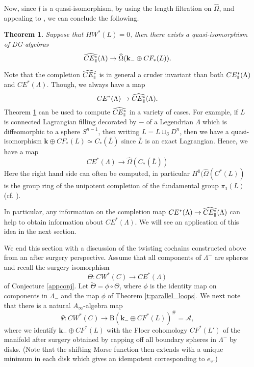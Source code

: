 \documentclass{gtpart}
\newtheorem{thm}{Theorem}
\renewcommand{\k}{\mathbf{k}}
\newcommand{\A}{\mathscr{A}}
\renewcommand{\Bar}{\mathrm{B}}
\renewcommand{\parallel}{{\mkern3mu\vphantom{\perp}\vrule depth 0pt\mkern2mu\vrule depth
0pt\mkern3mu}}
\begin{document}
Now, since $\mathfrak{f}$ is a quasi-isomorphism, by using the length filtration on
$\widehat{\Omega}$, and appealing to \cite[Thm. 7.4]{EM}, we can conclude the following. 

\begin{thm} \label{comple} 
	Suppose that $HW^*(L)=0$, then there exists a quasi-isomorphism of DG-algebras
    \[ \widehat{CE^*_{\parallel}}(\Lambda) \to \widehat{\Omega}(\k_{-} \oplus CF_*(L)). \]
\end{thm}

Note that the completion $\widehat{CE_{\parallel}^{*}}$ is in general a cruder invariant than
both $CE^{\ast}_{\parallel}(\Lambda)$ and $CE^*(\Lambda)$. Though, we always have a map 
\[ CE^*(\Lambda) \to \widehat{CE^*_{\parallel}}(\Lambda). \] 
Theorem \ref{comple} can be used to compute $\widehat{CE^*_{\parallel}}$ in a variety of
cases. For example, if $L$ is connected Lagrangian filling decorated by $-$ of a Legendrian $\Lambda$ which is
diffeomorphic to a sphere $S^{n-1}$, then
writing $\overline{L} = L \cup_{\partial} D^n$, then we have a quasi-isomorphism $\k \oplus
CF_*(L) \simeq C_*(\overline{L})$ since $\overline{L}$ is an exact Lagrangian. Hence, we have a map
\[ CE^*(\Lambda) \to \widehat{\Omega}(C_*(\overline{L})) \]
Here the right hand side can often be computed, in particular
$H^0(\widehat{\Omega}(C^*(L))$ is the group ring of the unipotent completion of the fundamental group
$\pi_1(L)$ (cf. \cite{chen}). 

In particular, any information on the completion map $CE^*(\Lambda) \to
\widehat{CE^*_{\parallel}}(\Lambda)$ can help to obtain information about $CE^*(\Lambda)$. We
will see an application of this idea in the next section. 


We end this section with a discussion of the twisting cochains constructed above from an after surgery perspective. Assume that all components of $\Lambda^{-}$ are spheres and recall the surgery isomorphism
\[ 
\Theta\colon CW^{\ast}(C)\to CE^{\ast}(\Lambda)
\]
of Conjecture \ref{appconj}. Let $\widetilde{\Theta}=\phi\circ\Theta$, where $\phi$ is the identity map on components in $\Lambda_{-}$ and the map $\phi$ of Theorem \ref{t:parallel=loops}. We next note that there is a natural $A_{\infty}$-algebra map 
\[ 
\Psi\colon CW^{\ast}(C)\to \Bar(\k_{-}\oplus CF^*(L))^\#=\A,
\]
where we identify $\k_{-}\oplus CF^{\ast}(L)$ with the Floer cohomology $CF^{\ast}(L')$ of the manifold after surgery obtained by capping off all boundary spheres in $\Lambda^{-}$ by disks. (Note that the shifting Morse function then extends with a unique minimum in each disk which gives an idempotent corresponding to $e_{v}$.)  
\end{document}

